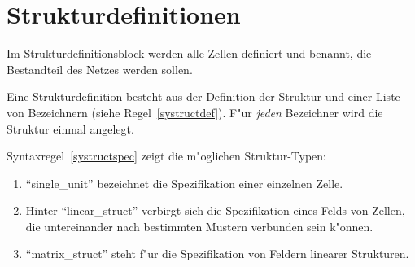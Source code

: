 \chapter{Strukturdefinitionen}
\label{Strukturdefinitionen}

Im Strukturdefinitionsblock werden
alle Zellen definiert und benannt, die Bestandteil des Netzes 
werden sollen.

\begin{center}
\end{center}

Eine Strukturdefinition besteht aus der Definition der
Struktur und einer Liste von
Bezeichnern (siehe Regel~\ref{systructdef}).  F"ur
{\it jeden\/} Bezeichner
wird die Struktur einmal angelegt.

Syntaxregel~\ref{systructspec} zeigt die m"oglichen Struktur-Typen:

\begin{enumerate}
\item ``single\_unit'' bezeichnet  die Spezifikation einer einzelnen
Zelle. 

\item Hinter ``linear\_struct'' verbirgt sich die Spezifikation eines
Felds von Zellen, die untereinander nach bestimmten
Mustern verbunden sein k"onnen.
  
\item ``matrix\_struct'' steht f"ur die Spezifikation von
Feldern linearer Strukturen. 
\end{enumerate}


